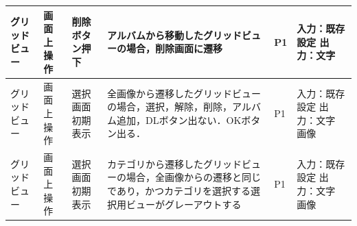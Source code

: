 \begin{table}[htbp]
\begin{tabular}{|p{8em}|p{7em}|p{9em}|p{9em}|p{3em}|p{12em}|}
    \hline
    グリッドビュー & 画面上操作 & 削除ボタン押下 & アルバムから移動したグリッドビューの場合，削除画面に遷移 & P1    & 入力：既存設定
出力：文字 \bigstrut\\
    \hline
    \multicolumn{1}{|l|}{グリッドビュー} & 画面上操作 & 選択画面初期表示 & 全画像から遷移したグリッドビューの場合，選択，解除，削除，アルバム追加，DLボタン出ない．OKボタン出る． & P1    & 入力：既存設定
出力：文字　画像 \bigstrut\\
    \hline
    \multicolumn{1}{|l|}{グリッドビュー} & 画面上操作 & 選択画面初期表示 & カテゴリから遷移したグリッドビューの場合，全画像からの遷移と同じであり，かつカテゴリを選択する選択用ビューがグレーアウトする & P1    & 入力：既存設定
出力：文字　画像 \bigstrut\\
    \hline
    \end{tabular}%
  \label{tab:D-4-ER-3}%
\end{table}%

